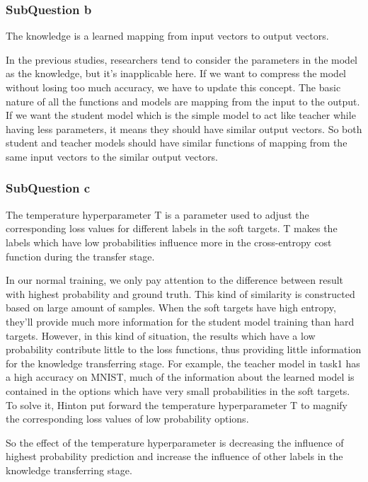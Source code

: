 \documentclass[conference]{IEEEtran}
\begin{document}
  \subsubsection{SubQuestion b}
  The knowledge is a learned mapping from input vectors to output vectors.\par
  In the previous studies, researchers tend to consider the parameters in the model as the knowledge, but it's inapplicable here. If we want to compress the model without losing too much accuracy, we have to update this concept. 
  The basic nature of all the functions and models are mapping from the input to the output. 
  If we want the student model which is the simple model to act like teacher while having less parameters, it means they should have similar output vectors. So both student and teacher models should have similar functions of mapping from the same input vectors to the similar output vectors.
  \subsubsection{SubQuestion c}
  The temperature hyperparameter T is a parameter used to adjust the corresponding loss values for different labels in the soft targets. T makes the labels which have low probabilities influence more in the cross-entropy cost function during the transfer stage.\par
  In our normal training, we only pay attention to the difference between result with highest probability and ground truth. This kind of similarity is constructed based on large amount of samples.
  When the soft targets have high entropy, they'll provide much more information for the student model training than hard targets. However, in this kind of situation, the results which have a low probability contribute little to the loss functions, thus providing little information for the knowledge transferring stage.
  For example, the teacher model in task1 has a high accuracy on MNIST, much of the information about the learned model is contained in the options which have very small probabilities in the soft targets. To solve it, Hinton\cite{b6} put forward the temperature hyperparameter T to magnify the corresponding loss values of low probability options.
  \par
  So the effect of the temperature hyperparameter is decreasing the influence of highest probability prediction and increase the influence of other labels in the knowledge transferring stage.
  
\end{document}
